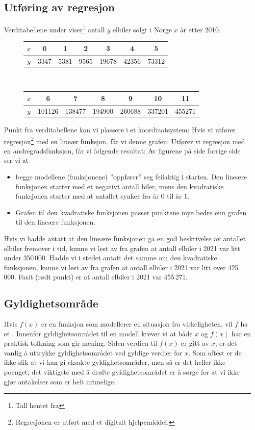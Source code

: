 \subsection{Utføring av regresjon}
Verditabellene under viser\footnote{Tall hentet fra } antall $y$ elbiler solgt i Norge $x$ år etter 2010. 
\begin{figure}
	\small
	\begin{tabular}{|c|c|c|c|c|c|c|}
		\hline
		$x$ & 0 & 1 & 2 & 3 & 4 & 5 \\ \hline
		$y$ & 3347 & 5381 & 9565 & 19678 & 42356 & 73312 \\ \hline
	\end{tabular}
	\\[5pt]
	\begin{tabular}{|c|c|c|c|c|c|c|}
		\hline
		$x$ & 6 & 7 & 8 & 9 & 10 & 11 \\ \hline
		$y$ & 101126 & 138477 & 194900 & 260688 & 337201 & 455271 \\ \hline
	\end{tabular}
\end{figure}
Punkt fra verditabellene kan vi plassere i et koordinatsystem:
\newpage
\label{linsalg}
Hvis vi utfører regresjon\footnote{Regresjonen er utført med et digitalt hjelpemiddel.} med en lineær funksjon, får vi denne grafen:
Utfører vi regresjon med en andregradsfunksjon, får vi følgende resultat:
\newpage
Av figurene på side forrige side ser vi at
\begin{itemize}
	\item begge modellene (funksjonene) ''oppfører'' seg feilaktig i starten. Den lineære funksjonen starter med et negativt antall biler, mens den kvadratiske funksjonen starter med at antallet synker fra år 0 til år 1.
	\item Grafen til den kvadratiske funksjonen passer punktene mye bedre enn grafen til den lineære funksjonen.
\end{itemize}
Hvis vi hadde antatt at den lineære funksjonen ga en god beskrivelse av antallet elbiler fremover i tid, kunne vi lest av fra grafen at antall elbiler i 2021 var litt under 350\,000. Hadde vi i stedet antatt det samme om den kvadratiske funksjonen, kunne vi lest av fra grafen at antall elbiler i 2021 var litt over 425\,000. Fasit (rødt punkt) er at antall elbiler i 2021 var 455\,271.
\subsection{Gyldighetsområde}
Hvis $f(x)$ er en funksjon som modellerer en situasjon fra virkeligheten, vil $f$ ha et . Innenfor gyldighetsområdet til en modell krever vi at både $x$ og $f(x)$ har en praktisk tolkning som gir mening. Siden verdien til $f(x)$ er gitt av $x$, er det vanlig å uttrykke gyldighetsområdet ved gyldige verdier for $x$. Som oftest er de ikke slik at vi kan gi eksakte gyldighetsområder, men så er det heller ikke poenget; det viktigste med å drøfte gyldighetsområdet er å sørge for at vi ikke gjør antakelser som er helt urimelige.
\newpage

